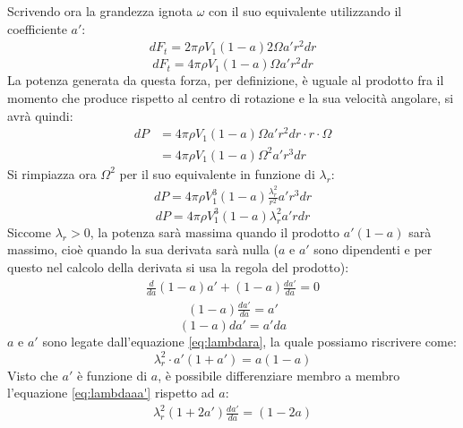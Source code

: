 Scrivendo ora la grandezza ignota $\omega$ con il suo equivalente utilizzando il coefficiente $a'$:
\begin{align*}
dF_t = 2 \pi \rho V_1 \left( 1- a \right) 2 \Omega a' r^2 dr
\end{align*}
\begin{equation}\label{eq:dftfin}
dF_t = 4 \pi \rho V_1 \left(1-a \right) \Omega a' r^2 dr
\end{equation}
La potenza generata da questa forza, per definizione, è uguale al prodotto fra il momento che produce rispetto al centro di rotazione e la sua velocità angolare, si avrà quindi:
\begin{align*}
dP &= 4 \pi \rho V_1 \left( 1-a \right) \Omega a' r^2 dr \cdot r \cdot \Omega \\
&= 4 \pi \rho V_1 \left( 1-a \right) \Omega^2 a' r^3 dr
\end{align*}
Si rimpiazza ora $\Omega^2$ per il suo equivalente in funzione di $\lambda_r$:
\begin{align*}
dP = 4 \pi \rho V_1^3 \left( 1- a \right) \frac{\lambda_r^2}{r^2} a' r^3 dr
\end{align*}
\begin{equation}
	 dP = 4 \pi \rho V_1^3 \left( 1 - a \right) \lambda_r^2 a' r dr
	 \label{eq:dP}
\end{equation}
Siccome $\lambda_r > 0$, la potenza sarà massima quando il prodotto $a' \left( 1- a \right)$ sarà massimo, cioè quando la sua derivata sarà nulla ($a$ e $a'$ sono dipendenti e per questo nel calcolo della derivata si usa la regola del prodotto):
\begin{align*}
\frac{d}{da} \left( 1-a \right) a' + \left( 1 -a \right) \frac{da'}{da} = 0
\end{align*}
\begin{align*}
\left( 1- a \right) \frac{da'}{da} = a'
\end{align*}
\begin{equation}\label{eq:aa'}
\left(1 - a \right) da' = a' da
\end{equation}
$a$ e $a'$ sono legate dall'equazione \ref{eq:lambdara}, la quale possiamo riscrivere come:
\begin{equation}\label{eq:lambdaraa'}
\lambda_r^2 \cdot a' \left( 1+ a' \right) = a \left( 1 - a \right)
\end{equation}
Visto che $a'$ è funzione di $a$, è possibile differenziare membro a membro l'equazione \ref{eq:lambdaaa'} rispetto ad $a$:
\begin{align*}
\lambda_r^2 \left( 1+ 2a' \right) \frac{da'}{da} = \left( 1 - 2a \right)
\end{align*}
